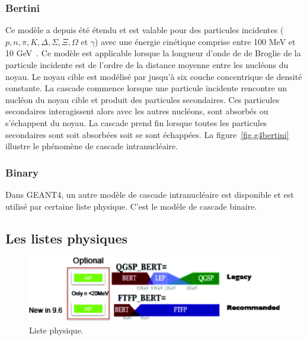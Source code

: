 \subsubsection{Bertini}
Ce modèle a depuis été étendu et est valable pour des particules incidentes ($p,n,\pi,K,\Delta,\Sigma,\Xi,\Omega$ et $\gamma$) avec une énergie cinétique comprise entre 100 MeV et 10 GeV~\cite{geant4_bertini}. Ce modèle est applicable lorsque la longueur d'onde de de Broglie de la particule incidente est de l'ordre de la distance moyenne entre les nucléons du noyau. Le noyau cible est modélisé par jusqu'à six couche concentrique de densité constante. La cascade commence lorsque une particule incidente rencontre un nucléon du noyau cible et produit des particules secondaires. Ces particules secondaires interagissent alors avec les autres nucléons, sont absorbés ou s'échappent du noyau. La cascade prend fin lorsque toutes les particules secondaires sont soit absorbées soit se sont échappées. La figure~\ref{fig.g4bertini} illustre le phénomène de cascade intranucléaire.
\subsubsection{Binary}
Dans GEANT4, un autre modèle de cascade intranucléaire est disponible et est utilisé par certaine liste physique. C'est le modèle de cascade binaire. 
\subsection{Les listes physiques}
\label{sec.listphys}
\begin{figure}[!ht]
  \begin{center}
    \includegraphics[width=.8\textwidth]{Digitizer/figs/physics_list_G4.pdf}
    \caption{Liste physique.}
    \label{fig.g4list}
  \end{center}
\end{figure}


